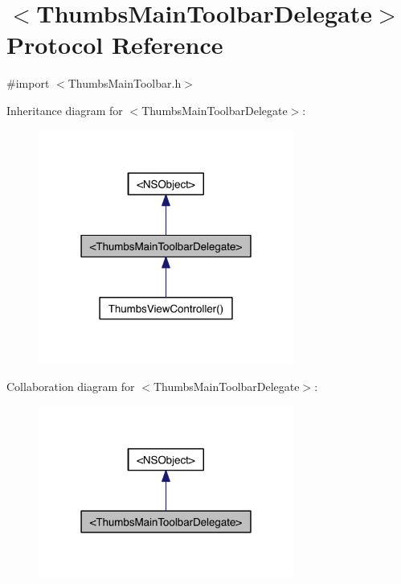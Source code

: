 \hypertarget{protocol_thumbs_main_toolbar_delegate-p}{\section{$<$Thumbs\-Main\-Toolbar\-Delegate$>$ Protocol Reference}
\label{dc/d59/protocol_thumbs_main_toolbar_delegate-p}
}


{\ttfamily \#import $<$Thumbs\-Main\-Toolbar.\-h$>$}



Inheritance diagram for $<$Thumbs\-Main\-Toolbar\-Delegate$>$\-:
\nopagebreak
\begin{figure}[H]
\begin{center}
\leavevmode
\includegraphics[width=238pt]{d9/db2/protocol_thumbs_main_toolbar_delegate-p__inherit__graph}
\end{center}
\end{figure}


Collaboration diagram for $<$Thumbs\-Main\-Toolbar\-Delegate$>$\-:
\nopagebreak
\begin{figure}[H]
\begin{center}
\leavevmode
\includegraphics[width=238pt]{dd/def/protocol_thumbs_main_toolbar_delegate-p__coll__graph}
\end{center}
\end{figure}
